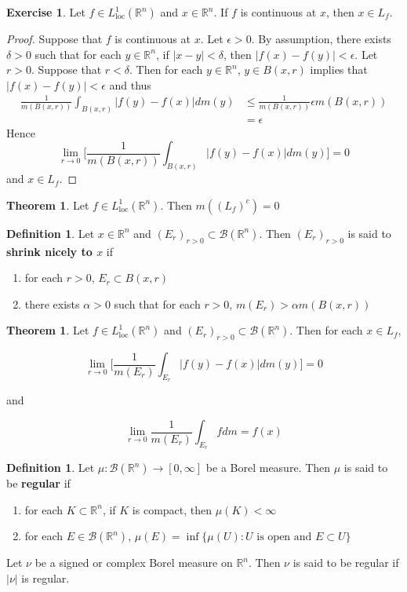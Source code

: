 \documentclass[12pt]{amsart}
\theoremstyle{definition}
\newtheorem{defn}[definition]{Definition}
\newtheorem{thm}[definition]{Theorem}
\newtheorem{ex}[definition]{Exercise}
\newcommand{\al}{\alpha}
\newcommand{\del}{\delta}
\newcommand{\ep}{\epsilon}
\newcommand{\R}{\mathbb{R}}
\newcommand{\MB}{\mathcal{B}}
\newcommand{\RG}{[0,\infty]}
\newcommand{\Ll}{L^1_{\text{loc}}(\R^n)}
\begin{document}
	\begin{ex}
		Let $f \in \Ll$ and $x \in \R^n$. If $f$ is continuous at $x$, then $x \in L_f$.
	\end{ex}
	
	\begin{proof}
		Suppose that $f$ is continuous at $x$. Let $\ep > 0$. By assumption, there exists $\del >0$ such that for each $y \in \R^n$, if $|x-y|< \del$, then $|f(x)-f(y)| < \ep$. Let $r >0$. Suppose that $r< \del$. Then for each $y \in \R^n$, $y \in B(x,r)$ implies that $|f(x) - f(y)| < \ep$ and thus 
		\begin{align*}
			\frac{1}{m(B(x,r))}\int_{B(x,r)}|f(y) - f(x)|dm(y)
			& \leq \frac{1}{m(B(x,r))} \ep m(B(x,r))\\
			&=\ep
		\end{align*}
		Hence $$\lim_{r \rightarrow 0} \bigg[ \frac{1}{m(B(x,r))}\int_{B(x,r)}|f(y) - f(x)|dm(y)\bigg] =0$$ 
		and $x \in L_f$.
	\end{proof}
	
	\begin{thm}
		Let $f \in \Ll$. Then $m((L_f)^c) = 0$
	\end{thm}
	
	\begin{defn}
		Let $x \in \R^n$ and $(E_r)_{r>0} \subset \MB(\R^n)$. Then $(E_r)_{r>0}$ is said to \textbf{shrink nicely to $x$} if 
		
		\begin{enumerate}
			\item for each $r>0$, $E_r \subset B(x,r)$
			\item there exists $\al >0$ such that for each $r>0$, $m(E_r)> \al m(B(x,r))$
		\end{enumerate} 
	\end{defn}
	
	\begin{thm}
		Let $f \in \Ll$ and $(E_r)_{r>0} \subset \MB(\R^n)$. Then for each $x \in L_f$, 
		
		$$\lim_{r \rightarrow 0} \bigg[ \frac{1}{m(E_r)}\int_{E_r}|f(y) - f(x)|dm(y)\bigg] =0$$
		
		and 
		
		$$\lim_{r \rightarrow 0}  \frac{1}{m(E_r)}\int_{E_r}fdm = f(x)$$
	\end{thm}
	
	\begin{defn}
		Let $\mu:\MB(\R^n) \rightarrow \RG$ be a Borel measure. Then $\mu$ is said to be \textbf{regular} if 
		\begin{enumerate}
			\item for each $K \subset \R^n$, if $K$ is compact, then $\mu(K)< \infty$
			\item for each $E \in \MB(\R^n)$, $\mu(E) = \inf \{\mu(U): U \text{ is open and }E \subset U\}$
		\end{enumerate}
		
		Let $\nu$ be a signed or complex Borel measure on $\R^n$. Then $\nu$ is said to be regular if $|\nu|$ is regular.
	\end{defn}
	
\end{document}
